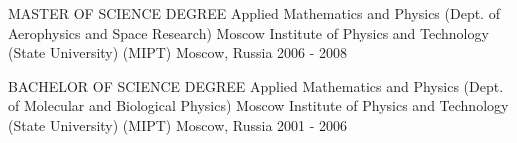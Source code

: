 
\begin{cventries}

  \cvblitz
    {MASTER OF SCIENCE DEGREE} %
    {Applied Mathematics and Physics (Dept. of Aerophysics and Space Research)}
    {Moscow Institute of Physics and Technology (State University) (MIPT)} %
    {Moscow, Russia} %
    {2006 - 2008} %

  \cvblitz
    {BACHELOR OF SCIENCE DEGREE} %
    {Applied Mathematics and Physics (Dept. of Molecular and Biological Physics)}
    {Moscow Institute of Physics and Technology (State University) (MIPT)} %
    {Moscow, Russia} %
    {2001 - 2006} %

\end{cventries}
